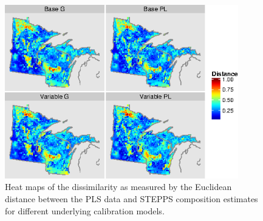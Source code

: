\begin{figure}
\centering
\includegraphics[width=4in]{figures/maps_l2.png}
\caption{Heat maps of the dissimilarity as measured by the Euclidean
  distance between the PLS data and STEPPS composition estimates for
  different underlying calibration models.}
\label{fig:maps_l2}
\end{figure}



